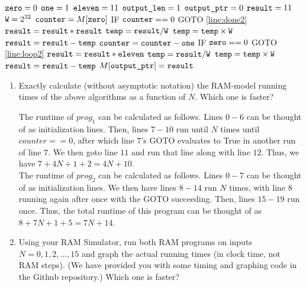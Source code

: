 \documentclass[11pt]{article}
\begin{document}
\begin{enumerate}
\begin{algorithm}[H]
\setcounter{AlgoLine}{-1}
$\texttt{zero} = 0$\;
$\texttt{one} = 1$\;
$\texttt{eleven} = 11$\;
$\texttt{output\_len} = 1$\;
$\texttt{output\_ptr} = 0$\;
$\texttt{result} = 11$\;
$\texttt{W} = 2^{32}$\;
$\texttt{counter} = M[\texttt{zero}]$\;
\Indp
IF $\texttt{counter} == 0$ GOTO \ref{line:done2}\; \label{line:loop2}
$\texttt{result} = \texttt{result} * \texttt{result}$\;
$\texttt{temp} = \texttt{result} / \texttt{W}$\;
$\texttt{temp} = \texttt{temp} \times \texttt{W}$\;
$\texttt{result} = \texttt{result} - \texttt{temp}$\;
$\texttt{counter} = \texttt{counter} - \texttt{one}$\;
IF $\texttt{zero} == 0$ GOTO \ref{line:loop2}\;
\Indm
$\texttt{result} = \texttt{result} * \texttt{eleven}$\;
\label{line:done2}
$\texttt{temp} = \texttt{result} / \texttt{W}$\;
$\texttt{temp} = \texttt{temp} \times \texttt{W}$\;
$\texttt{result} = \texttt{result} - \texttt{temp}$\;
$M[\texttt{output\_ptr}]=\texttt{result}$\; 
\end{algorithm}


\begin{enumerate}
    \item Exactly calculate (without asymptotic notation) the RAM-model running times of the above algorithms as a function of $N$.
    Which one is faster? \label{itm:RAMtime}

    The runtime of $prog_1$ can be calculated as follows. Lines $0-6$ can be thought of as initialization lines. Then, lines $7-10$ run until $N$ times until $counter == 0$, after which line $7$'s GOTO evaluates to True in another run of line $7$. We then goto line $11$ and run that line along with line $12$. Thus, we have $7 + 4N + 1 + 2 = 4N + 10$. \\
    
    The runtime of $prog_2$ can be calculated as follows. Lines $0-7$ can be thought of as initialization lines. We then have lines $8-14$ run $N$ times, with line $8$ running again after once with the GOTO succeeding. Then, lines $15-19$ run once. Thus, the total runtime of this program can be thought of as $8 + 7N + 1 + 5 = 7N + 14$.
    
    \item Using your RAM Simulator, run both RAM programs on inputs $N=0,1,2,\ldots,15$ and graph the actual running times (in clock time, not RAM steps).  (We have provided you with some timing and graphing code in the Github repository.) Which one is faster?  \label{itm:realtime} \\
    

\end{enumerate}
\end{enumerate}
\end{document}
